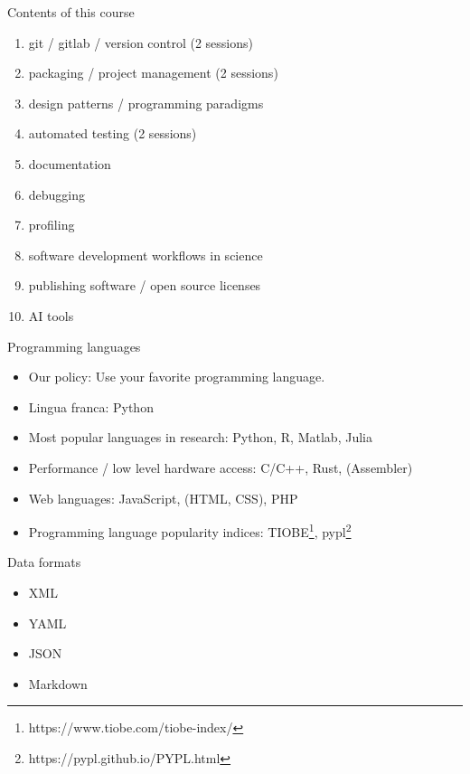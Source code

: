 \documentclass[aspectratio=169,graphics,handout]{beamer}
\begin{document}
\begin{frame}{Contents of this course}
    \begin{enumerate}
        \item git / gitlab / version control (2 sessions)
            \pause
        \item packaging / project management (2 sessions)
            \pause
        \item design patterns / programming paradigms
            \pause
        \item automated testing (2 sessions)
            \pause
        \item documentation
            \pause
        \item debugging
            \pause
        \item profiling
            \pause
        \item software development workflows in science
            \pause
        \item publishing software / open source licenses
            \pause
        \item AI tools
    \end{enumerate}
\end{frame}

\begin{frame}{Programming languages}
    \begin{itemize}
        \item Our policy: Use your favorite programming language.
        \item Lingua franca: Python
        \item Most popular languages in research: Python, R, Matlab, Julia
        \item Performance / low level hardware access: C/C++, Rust, (Assembler)
        \item Web languages: JavaScript, (HTML, CSS), PHP
        \item Programming language popularity indices: TIOBE\footnote{https://www.tiobe.com/tiobe-index/}, pypl\footnote{https://pypl.github.io/PYPL.html}
    \end{itemize}
\end{frame}

\begin{frame}{Data formats}

    \begin{itemize}
        \item XML
        \item YAML
        \item JSON
        \item Markdown
    \end{itemize}
\end{frame}
\end{document}
